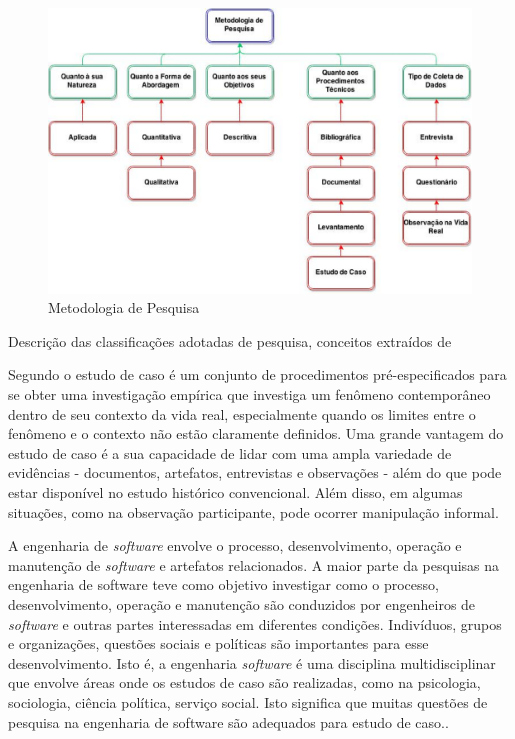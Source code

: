 \begin{figure}[h!]
\centering
\includegraphics[keepaspectratio=false,scale=0.5]{figuras/figuras_nilton/selecaoMetodologica.eps}
\caption{Metodologia de Pesquisa}
\label{7eixosqualidade}
\end{figure}

\begin{table}[!ht]
	\begin{center}
	
	 
	\caption{Descrição das classificações adotadas de pesquisa, conceitos extraídos de  }
	\label{tab:descricaoMetodologia}
	\end{center}
	\end{table}	
	\FloatBarrier

Segundo \cite{yin2001estudo} o estudo de caso é um conjunto de procedimentos pré-especificados para se obter uma investigação empírica que investiga um fenômeno contemporâneo dentro de seu contexto da vida real, especialmente quando os limites entre o fenômeno e o contexto não estão claramente definidos. Uma grande vantagem do estudo de caso é a sua capacidade de lidar com uma ampla variedade de evidências - documentos, artefatos, entrevistas e observações - além do que pode estar disponível no estudo histórico convencional. Além disso, em algumas situações, como na observação participante, pode ocorrer manipulação informal.

A engenharia de \textit{software} envolve o processo, desenvolvimento, operação e manutenção  de \textit{software} e artefatos relacionados. A maior parte da pesquisas na engenharia de software teve como objetivo investigar como o processo, desenvolvimento, operação e manutenção são conduzidos por engenheiros de \textit{software} e outras partes interessadas em diferentes condições. Indivíduos, grupos e organizações, questões sociais e políticas são importantes para esse desenvolvimento. Isto é, a engenharia \textit{software } é uma disciplina multidisciplinar que envolve áreas onde os estudos de caso são realizadas, como na psicologia, sociologia, ciência política, serviço social. Isto significa que muitas questões de pesquisa na engenharia de software são adequados para estudo de caso.\cite{wohlin2012experimentation}.

